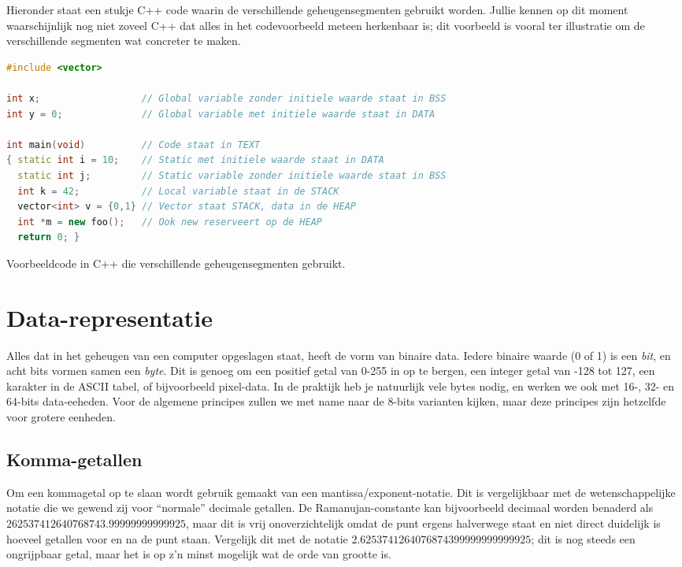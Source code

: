 Hieronder staat een stukje C++ code waarin de verschillende geheugensegmenten gebruikt worden. Jullie kennen op dit moment waarschijnlijk nog niet zoveel C++ dat alles in het codevoorbeeld meteen herkenbaar is; dit voorbeeld is vooral ter illustratie om de verschillende segmenten wat concreter te maken.

\begin{listing}
\begin{lstlisting}[language=C++]
#include <vector>

int x;                  // Global variable zonder initiele waarde staat in BSS
int y = 0;              // Global variable met initiele waarde staat in DATA

int main(void)          // Code staat in TEXT
{ static int i = 10;    // Static met initiele waarde staat in DATA
  static int j;         // Static variable zonder initiele waarde staat in BSS
  int k = 42;           // Local variable staat in de STACK
  vector<int> v = {0,1} // Vector staat STACK, data in de HEAP
  int *m = new foo();   // Ook new reserveert op de HEAP
  return 0; }
\end{lstlisting}
\caption{Voorbeeldcode in C++ die verschillende geheugensegmenten gebruikt.}
\end{listing}

\section{Data-representatie}
Alles dat in het geheugen van een computer opgeslagen staat, heeft de vorm van binaire data. Iedere binaire waarde (0 of 1) is een \emph{bit}, en acht bits vormen samen een \emph{byte}. Dit is genoeg om een positief getal van 0-255 in op te bergen, een integer getal van -128 tot 127, een karakter in de ASCII tabel, of bijvoorbeeld pixel-data. In de praktijk heb je natuurlijk vele bytes nodig, en werken we ook met 16-, 32- en 64-bits data-eeheden. Voor de algemene principes zullen we met name naar de 8-bits varianten kijken, maar deze principes zijn hetzelfde voor grotere eenheden.


\subsection{Komma-getallen}
Om een kommagetal op te slaan wordt gebruik gemaakt van een mantissa/exponent-notatie. Dit is vergelijkbaar met de wetenschappelijke notatie die we gewend zij voor \enquote{normale} decimale getallen. De Ramanujan-constante kan bijvoorbeeld decimaal worden benaderd als $262537412640768743.99999999999925$, maar dit is vrij onoverzichtelijk omdat de punt ergens halverwege staat en niet direct duidelijk is hoeveel getallen voor en na de punt staan. Vergelijk dit met de notatie $2.6253741264076874399999999999925$; dit is nog steeds een ongrijpbaar getal, maar het is op z'n minst mogelijk wat de orde van grootte is.


